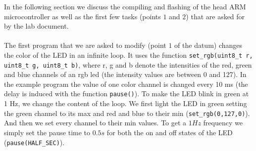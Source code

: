 \documentclass[11pt]{article}
\begin{document}
In the following section we discuss the compiling and flashing of the head ARM microcontroller as well as the first few tasks (points $1$ and $2$) that are asked for by the lab document.
\\ \\
The first program that we are asked to modify (point $1$ of the datum) changes the color of the LED in an infinite loop. It uses the function \texttt{set\_rgb(uint8\_t r, uint8\_t g, uint8\_t b)}, where r, g and b denote the intensities of the red, green and blue channels of an rgb led (the intensity values are between 0 and 127). In the example program the value of one color channel is changed every 10 ms (the delay is induced with the function \texttt{pause()}). %
To make the LED blink in green at 1 Hz, we change the content of the loop. We first light the LED in green setting the green channel to its max and red and blue to their min (\texttt{set\_rgb(0,127,0)}). And then we set every channel to their min values. To get a $1Hz$ frequency we simply set the pause time to $0.5s$ for both the on and off states of the LED (\texttt{pause(HALF\_SEC)}). %
\\
\\
\end{document}
